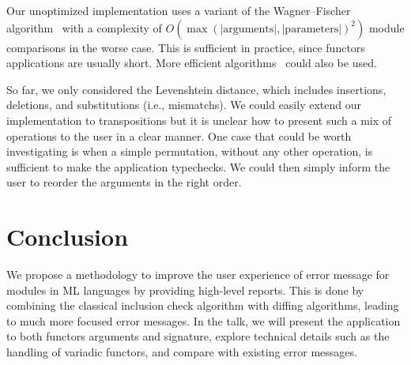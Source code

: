 \documentclass[a4paper,11pt]{scrartcl}
\begin{document}
Our unoptimized implementation uses a variant of the
Wagner–Fischer algorithm~\cite{DBLP:journals/jacm/WagnerF74} with a complexity of
$O(\max(\mathrm{|arguments|,|parameters|})^2)$ module comparisons in the worse case.
This is sufficient in practice, since functors applications are usually short.
More efficient algorithms~\cite{DBLP:journals/siamcomp/LandauMS98} could also be
used.

So far, we only considered the Levenshtein distance, which includes
insertions, deletions, and substitutions (i.e., mismatchs). We could easily extend
our implementation to transpositions but it is unclear how to present
such a mix of operations to the user in a clear manner.
One case that could be worth investigating is when a simple permutation,
without any other operation,
is sufficient to make the application typechecks. We could then simply
inform the user to reorder the arguments in the right order.



\section{Conclusion}

We propose a methodology to improve the user experience of error message for modules in ML languages by providing high-level reports.
This is done by combining the classical
inclusion check algorithm with diffing algorithms, leading to much more
focused error messages.
In the talk, we will present the application to both functors arguments and
signature, explore technical details such as the handling of variadic functors,
and compare with existing error messages.

\printbibliography
\end{document}
